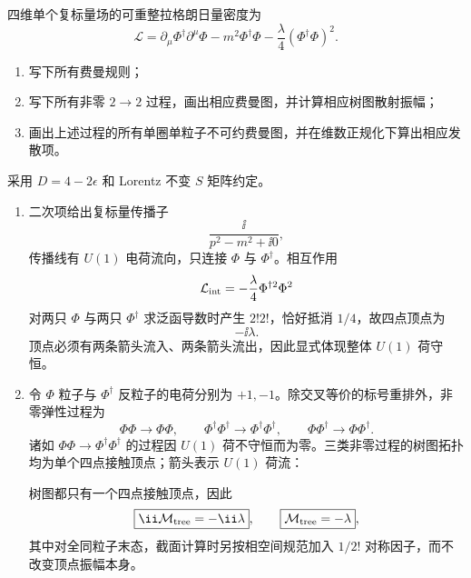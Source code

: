 
\begin{question}[40 分]
四维单个复标量场的可重整拉格朗日量密度为
\[
\mathcal L=\partial_\mu\Phi^\dagger\partial^\mu\Phi
-m^2\Phi^\dagger\Phi-\frac\lambda4(\Phi^\dagger\Phi)^2.
\]
\begin{enumerate}
  \item 写下所有费曼规则；
  \item 写下所有非零 $2\to2$ 过程，画出相应费曼图，并计算相应树图散射振幅；
  \item 画出上述过程的所有单圈单粒子不可约费曼图，并在维数正规化下算出相应发散项。
\end{enumerate}
\begin{solution}
采用 $D=4-2\epsilon$ 和 Lorentz 不变 $S$ 矩阵约定。
\begin{enumerate}
  \item 二次项给出复标量传播子
  \[
  \boxed{\frac{\ii}{p^2-m^2+\ii0}},
  \]
  传播线有 $U(1)$ 电荷流向，只连接 $\Phi$ 与 $\Phi^\dagger$。相互作用
  \[
  \mathcal L_{\rm int}=-\frac\lambda4\Phi^{\dagger2}\Phi^2
  \]
  对两只 $\Phi$ 与两只 $\Phi^\dagger$ 求泛函导数时产生 $2!2!$，恰好抵消 $1/4$，故四点顶点为
  \[
  \boxed{-\ii\lambda}.
  \]
  顶点必须有两条箭头流入、两条箭头流出，因此显式体现整体 $U(1)$ 荷守恒。

  \item 令 $\Phi$ 粒子与 $\Phi^\dagger$ 反粒子的电荷分别为 $+1,-1$。除交叉等价的标号重排外，非零弹性过程为
  \[
  \Phi\Phi\to\Phi\Phi,
  \qquad
  \Phi^\dagger\Phi^\dagger\to\Phi^\dagger\Phi^\dagger,
  \qquad
  \Phi\Phi^\dagger\to\Phi\Phi^\dagger.
  \]
  诸如 $\Phi\Phi\to\Phi^\dagger\Phi^\dagger$ 的过程因 $U(1)$ 荷不守恒而为零。三类非零过程的树图拓扑均为单个四点接触顶点；箭头表示 $U(1)$ 荷流：
  \begin{center}
  \end{center}
  树图都只有一个四点接触顶点，因此
  \[
  \boxed{\ii\mathcal M_{\rm tree}=-\ii\lambda},
  \qquad
  \boxed{\mathcal M_{\rm tree}=-\lambda},
  \]
  其中对全同粒子末态，截面计算时另按相空间规范加入 $1/2!$ 对称因子，而不改变顶点振幅本身。


\end{enumerate}
\end{solution}
\end{question}
